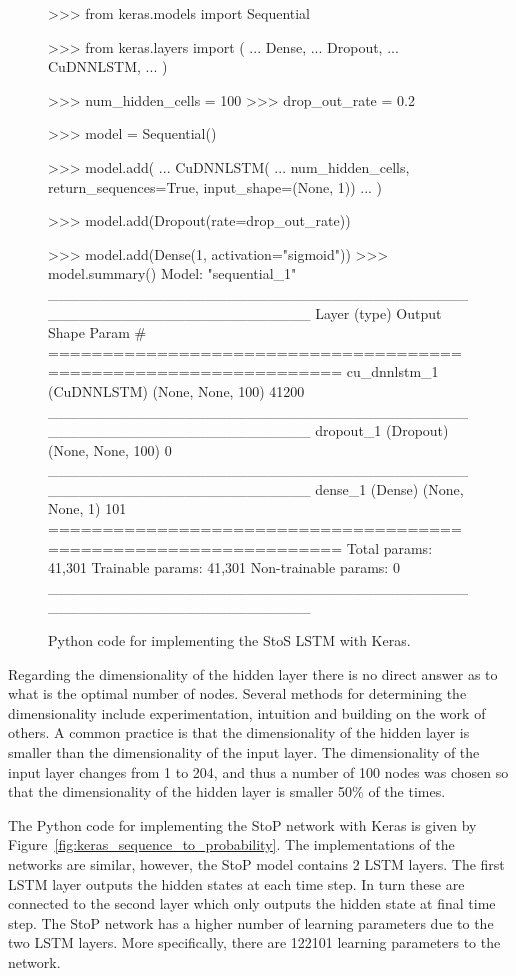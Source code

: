 \begin{figure}[!htbp]
\begin{usagepy}
>>> from keras.models import Sequential

>>> from keras.layers import (
...     Dense,
...     Dropout,
...     CuDNNLSTM,
... )

>>> num_hidden_cells = 100
>>> drop_out_rate = 0.2

>>> model = Sequential()

>>> model.add(
...    CuDNNLSTM(
...        num_hidden_cells, return_sequences=True, input_shape=(None, 1))
... )

>>> model.add(Dropout(rate=drop_out_rate))

>>> model.add(Dense(1, activation="sigmoid"))
>>> model.summary()
Model: "sequential_1"
_________________________________________________________________
Layer (type)                 Output Shape              Param #   
=================================================================
cu_dnnlstm_1 (CuDNNLSTM)     (None, None, 100)         41200     
_________________________________________________________________
dropout_1 (Dropout)          (None, None, 100)         0         
_________________________________________________________________
dense_1 (Dense)              (None, None, 1)           101       
=================================================================
Total params: 41,301
Trainable params: 41,301
Non-trainable params: 0
_________________________________________________________________

\end{usagepy}
\caption{Python code for implementing the StoS LSTM with Keras.}\label{fig:keras_sequence_to_sequence}
\end{figure}

Regarding the dimensionality of the hidden layer there is no direct answer as to
what is the optimal number of nodes. Several methods for determining the
dimensionality include experimentation, intuition and building on the work of
others. A common practice is that the dimensionality of the hidden layer is
smaller than the dimensionality of the input layer. The dimensionality of the
input layer changes from 1 to 204, and thus a number of 100 nodes was chosen
so that the dimensionality of the hidden layer is smaller 50\% of the times.

The Python code for implementing the StoP network with Keras is given by
Figure~\ref{fig:keras_sequence_to_probability}. The implementations of the
networks are similar, however, the StoP model contains 2 LSTM layers. The first
LSTM layer outputs the hidden states at each time step. In turn these are connected to
the second layer which only outputs the hidden state at final time step. The StoP
network has a higher number of learning parameters due to the two LSTM layers.
More specifically, there are 122101 learning parameters to the network.

